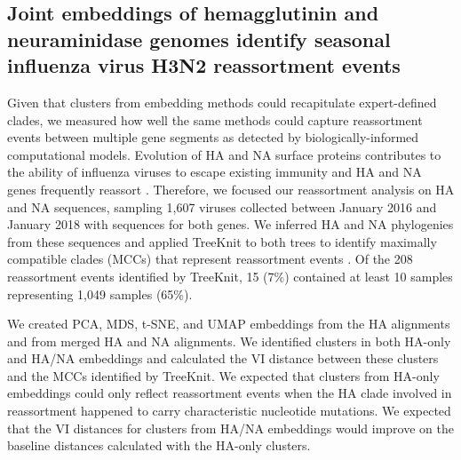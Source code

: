 \documentclass[webpdf,contemporary,large,single]{oup-authoring-template}%
\theoremstyle{thmstyleone}%
\theoremstyle{thmstyletwo}%
\theoremstyle{thmstylethree}%
\begin{document}
\subsection{Joint embeddings of hemagglutinin and neuraminidase genomes identify seasonal influenza virus H3N2 reassortment events}

Given that clusters from embedding methods could recapitulate expert-defined clades, we measured how well the same methods could capture reassortment events between multiple gene segments as detected by biologically-informed computational models.
Evolution of HA and NA surface proteins contributes to the ability of influenza viruses to escape existing immunity \citep{Petrova2018} and HA and NA genes frequently reassort \citep{Nelson2008,Marshall2013,Potter2019}.
Therefore, we focused our reassortment analysis on HA and NA sequences, sampling 1,607 viruses collected between January 2016 and January 2018 with sequences for both genes.
We inferred HA and NA phylogenies from these sequences and applied TreeKnit to both trees to identify maximally compatible clades (MCCs) that represent reassortment events \citep{Barrat-Charlaix2022}.
Of the 208 reassortment events identified by TreeKnit, 15 (7\%) contained at least 10 samples representing 1,049 samples (65\%).

We created PCA, MDS, t-SNE, and UMAP embeddings from the HA alignments and from merged HA and NA alignments.
We identified clusters in both HA-only and HA/NA embeddings and calculated the VI distance between these clusters and the MCCs identified by TreeKnit.
We expected that clusters from HA-only embeddings could only reflect reassortment events when the HA clade involved in reassortment happened to carry characteristic nucleotide mutations.
We expected that the VI distances for clusters from HA/NA embeddings would improve on the baseline distances calculated with the HA-only clusters.
\end{document}

